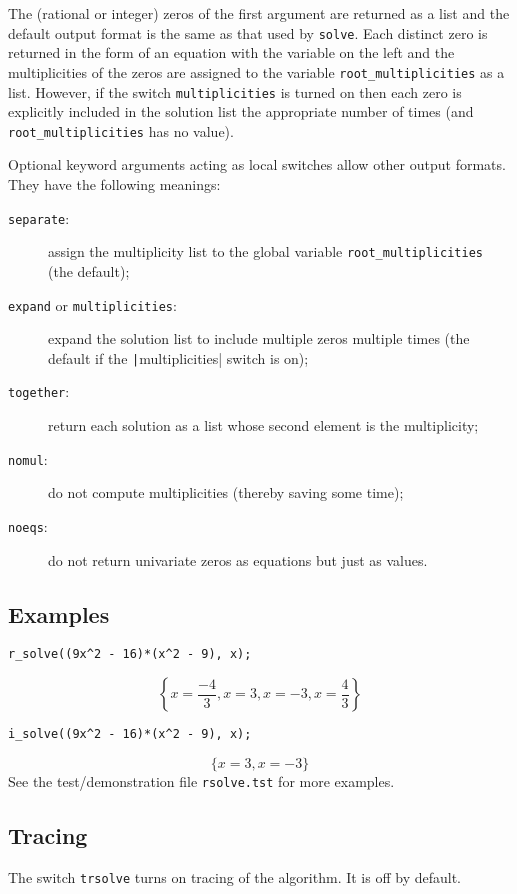 The (rational or integer) zeros of the first argument are returned as
a list and the default output format is the same as that used by
\verb|solve|.  Each distinct zero is returned in the form of an
equation with the variable on the left and the multiplicities of the
zeros are assigned to the variable \verb|root_multiplicities| as a
list.  However, if the switch \verb|multiplicities| is turned on then
each zero is explicitly included in the solution list the appropriate
number of times (and \verb|root_multiplicities| has no value).
  
\begin{sloppypar}
Optional keyword arguments acting as local switches allow other output
formats.  They have the following meanings:
\begin{description}
\item[\texttt{separate}:] assign the multiplicity list to the global
  variable \texttt{root\_multiplicities} (the default);
\item[\texttt{expand} or \texttt{multiplicities}:] expand the solution
  list to include multiple zeros multiple times (the default if the
  \texttt|multiplicities| switch is on);
\item[\texttt{together}:] return each solution as a list whose second
  element is the multiplicity;
\item[\texttt{nomul}:] do not compute multiplicities (thereby saving
  some time);
\item[\texttt{noeqs}:] do not return univariate zeros as equations but
  just as values.
\end{description}
\end{sloppypar}


\subsection{Examples}

\begin{verbatim}
r_solve((9x^2 - 16)*(x^2 - 9), x);
\end{verbatim}
\[
  \left\{x=\frac{-4}{3},x=3,x=-3,x=\frac{4}{3}\right\}
\]
\begin{verbatim}
i_solve((9x^2 - 16)*(x^2 - 9), x);
\end{verbatim}
\[
  \{x=3,x=-3\}
\]
See the test/demonstration file \verb|rsolve.tst| for more examples.


\subsection{Tracing}

The switch {\tt trsolve} turns on tracing of the algorithm.  It is off
by default.

